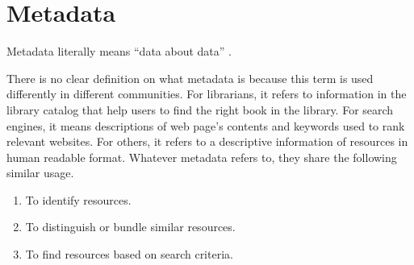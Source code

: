 \section{Metadata}

Metadata literally means \enquote{data about data} \cite[p.~1]{baca_2008}.

There is no clear definition on what metadata is because this term is used differently in different communities.
For librarians, it refers to information in the library catalog that help users to find the right book in the library.
For search engines, it means descriptions of web page's contents and keywords used to rank relevant websites.
For others, it refers to a descriptive information of resources in human readable format.
Whatever metadata refers to, they share the following similar usage.
\begin{enumerate}
	\item To identify resources.
	\item To distinguish or bundle similar resources.
	\item To find resources based on search criteria.
\end{enumerate}


